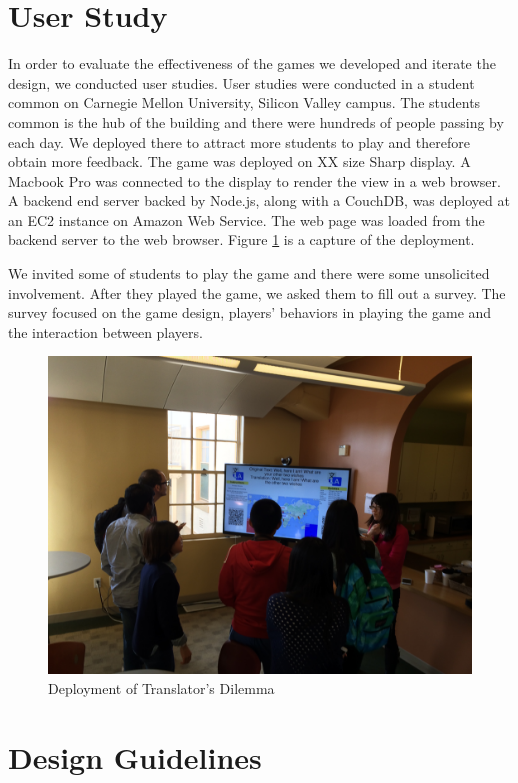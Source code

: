 \documentclass{sig-alternate}
\begin{document}
\section{User Study}
In order to evaluate the effectiveness of the games we developed and iterate the design, we conducted user studies. User studies were conducted in a student common on Carnegie Mellon University, Silicon Valley campus. The students common is the hub of the building and there were hundreds of people passing by each day. We deployed there to attract more students to play and therefore obtain more feedback. The game was deployed on XX size Sharp display. A Macbook Pro was connected to the display to render the view in a web browser. A backend end server backed by Node.js, along with a CouchDB, was deployed at an EC2 instance on Amazon Web Service. The web page was loaded from the backend server to the web browser. Figure \ref{us:deployment} is a capture of the deployment. 

We invited some of students to play the game and there were some unsolicited involvement. After they played the game, we asked them to fill out a survey. The survey focused on the game design, players' behaviors in playing the game and the interaction between players.

\begin{figure}
	\includegraphics[width=\linewidth]{deploy.jpg}
	\caption{Deployment of Translator's Dilemma}
	\label{us:deployment}
\end{figure}

\section{Design Guidelines}
\end{document}
